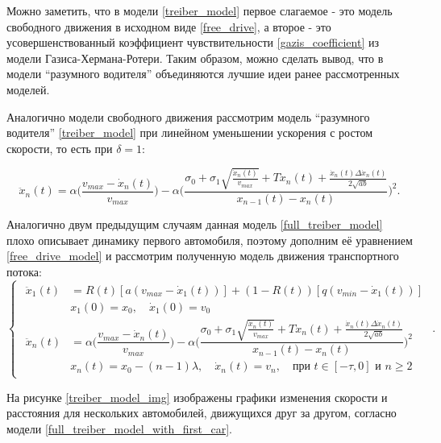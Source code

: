 \documentclass[12pt, a4paper]{extarticle}
\numberwithin{equation}{section}
\numberwithin{figure}{section}
\begin{document}
Можно заметить, что в модели \eqref{treiber_model} первое слагаемое - это модель свободного движения в исходном виде \eqref{free_drive}, а второе - это усовершенствованный коэффициент чувствительности \eqref{gazis_coefficient} из модели Газиса-Хермана-Ротери. Таким образом, можно сделать вывод, что в модели ``разумного водителя'' объединяются лучшие идеи ранее рассмотренных моделей.

Аналогично модели свободного движения рассмотрим модель ``разумного водителя'' \eqref{treiber_model} при линейном уменьшении ускорения с ростом скорости, то есть при $\delta=1$:

\begin{equation} \label{full_treiber_model}
\ddot{x}_n(t)= \alpha\bigg(\dfrac{v_{max}-\dot{x}_n(t)}{v_{max}} \bigg) - \alpha\bigg( \dfrac{\sigma_0+\sigma_1\sqrt{\frac{ \dot{x}_n(t)}{v_{max}}} +T \dot{x}_n(t)+ \frac{ \dot{x}_n(t)\Delta \dot{x}_n(t) }{2\sqrt{ab}}}{x_{n-1}(t)-x_n(t)}\bigg)^2.
\end{equation}

Аналогично двум предыдущим случаям данная модель \eqref{full_treiber_model} плохо описывает динамику первого автомобиля, поэтому дополним её уравнением \eqref{free_drive_model} и рассмотрим полученную модель движения транспортного потока:
\begin{equation} \label{full_treiber_model_with_first_car} 
\begin{cases}
\begin{split}
\ddot{x}_1(t)& = R(t) \left[ a\left(v_{max}-\dot{x}_1(t) \right)\right] + (1-R(t)) \left[ q\left( v_{min} - \dot{x}_1(t)\right) \right] \\
&x_{1}(0)=x_0, \quad \dot{x}_{1}(0)=v_{0}\\
\ddot{x}_n(t)& = \alpha\bigg(\dfrac{v_{max}-\dot{x}_n(t)}{v_{max}} \bigg) - \alpha\bigg( \dfrac{\sigma_0+\sigma_1\sqrt{\frac{ \dot{x}_n(t)}{v_{max}}} +T \dot{x}_n(t)+ \frac{ \dot{x}_n(t)\Delta \dot{x}_n(t) }{2\sqrt{ab}}}{x_{n-1}(t)-x_n(t)}\bigg)^2 \\
&x_n(t)=x_0-(n-1)\lambda, \quad \dot{x}_n(t)=v_{n}, \quad \text{при } t \in [-\tau,0] \text{ и } n\geq2
\end{split}
\end{cases}.
\end{equation}

На рисунке \ref{treiber_model_img} изображены графики изменения скорости и расстояния для нескольких автомобилей, движущихся друг за другом, согласно модели \eqref{full_treiber_model_with_first_car}.
\end{document}
